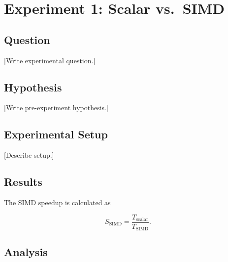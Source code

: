 \documentclass[11pt]{article}
\begin{document}

\section{Experiment 1: Scalar vs.\ SIMD}

\subsection{Question}


[Write experimental question.]

\subsection{Hypothesis}


[Write pre-experiment hypothesis.]

\subsection{Experimental Setup}


[Describe setup.]

\subsection{Results}


The SIMD speedup is calculated as

\begin{equation}
    S_{\mathrm{SIMD}}
    =
    \frac{T_{\mathrm{scalar}}}
         {T_{\mathrm{SIMD}}}.
\end{equation}

\subsection{Analysis}
\end{document}
